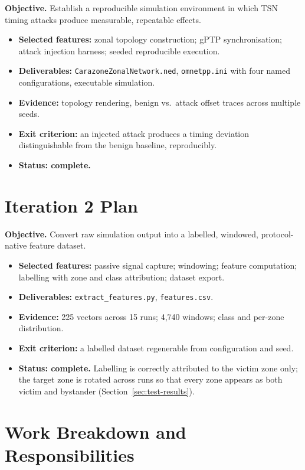 \textbf{Objective.} Establish a reproducible simulation environment in which TSN
timing attacks produce measurable, repeatable effects.

\begin{itemize}
  \item \textbf{Selected features:} zonal topology construction; gPTP synchronisation;
        attack injection harness; seeded reproducible execution.
  \item \textbf{Deliverables:} \texttt{CarazoneZonalNetwork.ned},
        \texttt{omnetpp.ini} with four named configurations, executable simulation.
  \item \textbf{Evidence:} topology rendering, benign vs.\ attack offset traces
        across multiple seeds.
  \item \textbf{Exit criterion:} an injected attack produces a timing deviation
        distinguishable from the benign baseline, reproducibly.
  \item \textbf{Status: complete.}
\end{itemize}

\section{Iteration 2 Plan}
\label{sec:iter2}

\textbf{Objective.} Convert raw simulation output into a labelled, windowed,
protocol-native feature dataset.

\begin{itemize}
  \item \textbf{Selected features:} passive signal capture; windowing; feature
        computation; labelling with zone and class attribution; dataset export.
  \item \textbf{Deliverables:} \texttt{extract\_features.py}, \texttt{features.csv}.
  \item \textbf{Evidence:} 225 vectors across 15 runs; 4{,}740 windows; class and
        per-zone distribution.
  \item \textbf{Exit criterion:} a labelled dataset regenerable from configuration and
        seed.
  \item \textbf{Status: complete.} Labelling is correctly attributed to the victim
        zone only; the target zone is rotated across runs so that every zone appears
        as both victim and bystander (Section~\ref{sec:test-results}).
\end{itemize}

\section{Work Breakdown and Responsibilities}
\label{sec:workbreakdown}


